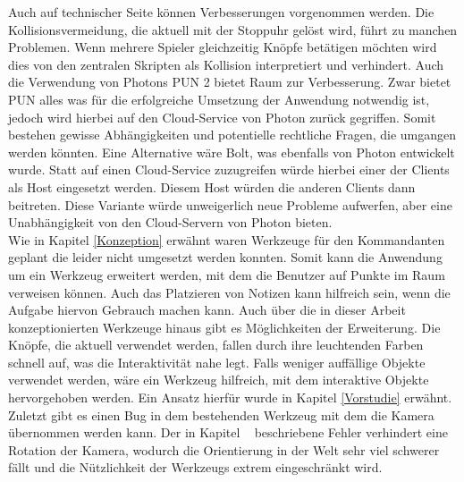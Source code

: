 Auch auf technischer Seite können Verbesserungen vorgenommen werden. Die Kollisionsvermeidung, die aktuell mit der Stoppuhr gelöst wird, führt zu manchen Problemen. Wenn mehrere Spieler gleichzeitig Knöpfe betätigen möchten wird dies von den zentralen Skripten als Kollision interpretiert und verhindert. Auch die Verwendung von Photons PUN 2 bietet Raum zur Verbesserung. Zwar bietet PUN alles was für die erfolgreiche Umsetzung der Anwendung notwendig ist, jedoch wird hierbei auf den Cloud-Service von Photon zurück gegriffen. Somit bestehen gewisse Abhängigkeiten und potentielle rechtliche Fragen, die umgangen werden könnten. Eine Alternative wäre Bolt, was ebenfalls von Photon entwickelt wurde. Statt auf einen Cloud-Service zuzugreifen würde hierbei einer der Clients als Host eingesetzt werden. Diesem Host würden die anderen Clients dann beitreten. Diese Variante würde unweigerlich neue Probleme aufwerfen, aber eine Unabhängigkeit von den Cloud-Servern von Photon bieten.\\

Wie in Kapitel \ref{Konzeption} erwähnt waren Werkzeuge für den Kommandanten geplant die leider nicht umgesetzt werden konnten. Somit kann die Anwendung um ein Werkzeug erweitert werden, mit dem die Benutzer auf Punkte im Raum verweisen können. Auch das Platzieren von Notizen kann hilfreich sein, wenn die Aufgabe hiervon Gebrauch machen kann. Auch über die in dieser Arbeit konzeptionierten Werkzeuge hinaus gibt es Möglichkeiten der Erweiterung. Die Knöpfe, die aktuell verwendet werden, fallen durch ihre leuchtenden Farben schnell auf, was die Interaktivität nahe legt. Falls weniger auffällige Objekte verwendet werden, wäre ein Werkzeug hilfreich, mit dem interaktive Objekte hervorgehoben werden. Ein Ansatz hierfür wurde in Kapitel \ref{Vorstudie} erwähnt. Zuletzt gibt es einen Bug in dem bestehenden Werkzeug mit dem die Kamera übernommen werden kann. Der in Kapitel ~ beschriebene Fehler verhindert eine Rotation der Kamera, wodurch die Orientierung in der Welt sehr viel schwerer fällt und die Nützlichkeit der Werkzeugs extrem eingeschränkt wird.